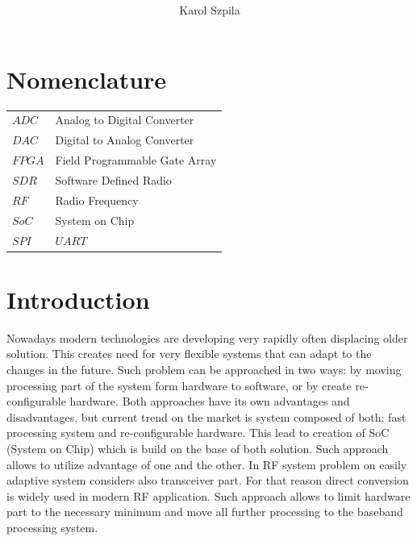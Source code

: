 \documentclass[en,printmode]{mgr}
\title{ }
\author{Karol Szpila}
\begin{document}

\maketitle %

\chapter*{Nomenclature}
\begin{table}[!htb]
\begin{tabular}{ll}
$ADC$  & Analog to Digital Converter   \\
$DAC$  & Digital to Analog Converter   \\
$FPGA$ & Field Programmable Gate Array \\
$SDR$  & Software Defined Radio \\
$RF$   & Radio Frequency \\
$SoC$  & System on Chip   \\
$SPI$  &

$UART$                        
\end{tabular}
\end{table}

\tableofcontents %

\let\cleardoublepage\clearpage %

\chapter{Introduction}
	Nowadays modern technologies are developing very rapidly often displacing older solution. This creates need
	for very flexible systems that can adapt to the changes in the future. Such problem can be approached in
	two ways: by moving processing part of the system form hardware to software, or by create re-configurable
	hardware. Both approaches have its own advantages and disadvantages, but current trend on the market is
	system composed of both: fast processing system and re-configurable hardware. This lead to creation of SoC
	(System on Chip) which is build on the base of both solution. Such approach allows to utilize advantage of
	one and the other. In RF system problem on easily adaptive system considers also transceiver part. For that
	reason direct conversion is widely used in modern RF application. Such approach allows to limit hardware part
	to the necessary minimum and move all further processing to the baseband processing system. 
	
\end{document}
